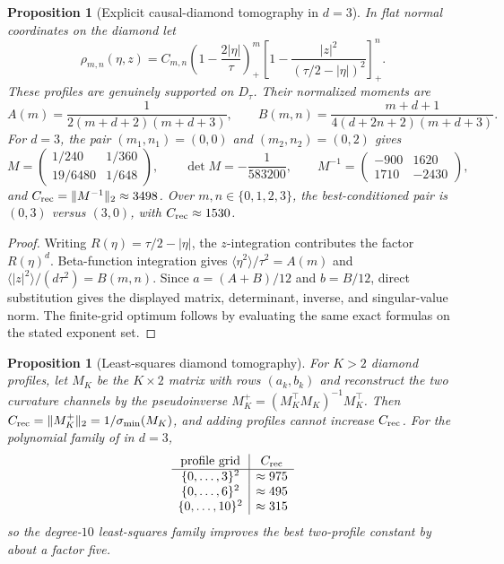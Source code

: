 \documentclass[11pt]{article}
\newtheorem{proposition}[theorem]{Proposition}
\theoremstyle{definition}
\theoremstyle{remark}
\begin{document}
\begin{proposition}[Explicit causal-diamond tomography in $d=3$]
\label{prop:explicit-tomography}
In flat normal coordinates on the diamond let
\[
 \rho_{m,n}(\eta,z)=C_{m,n}
 \left(1-\frac{2|\eta|}{\tau}\right)_+^m
 \left[1-\frac{|z|^2}{(\tau/2-|\eta|)^2}\right]_+^n .
\]
These profiles are genuinely supported on $D_\tau$.  Their normalized moments
are
\[
 A(m)=\frac{1}{2(m+d+2)(m+d+3)},\qquad
 B(m,n)=\frac{m+d+1}{4(d+2n+2)(m+d+3)}.
\]
For $d=3$, the pair $(m_1,n_1)=(0,0)$ and $(m_2,n_2)=(0,2)$ gives
\[
 M=\begin{pmatrix}1/240&1/360\\[2pt]19/6480&1/648\end{pmatrix},
 \qquad \det M=-\frac1{583200},
 \qquad M^{-1}=\begin{pmatrix}-900&1620\\1710&-2430\end{pmatrix},
\]
and $C_{\rm rec}=\|M^{-1}\|_2\approx3498$.  Over
$m,n\in\{0,1,2,3\}$, the best-conditioned pair is $(0,3)$ versus $(3,0)$,
with $C_{\rm rec}\approx1530$.
\end{proposition}

\begin{proof}
Writing $R(\eta)=\tau/2-|\eta|$, the $z$-integration contributes the factor
$R(\eta)^d$.  Beta-function integration gives
$\langle\eta^2\rangle/\tau^2=A(m)$ and
$\langle|z|^2\rangle/(d\tau^2)=B(m,n)$.  Since
$a=(A+B)/12$ and $b=B/12$, direct substitution gives the displayed matrix,
determinant, inverse, and singular-value norm.  The finite-grid optimum follows
by evaluating the same exact formulas on the stated exponent set.
\end{proof}


\begin{proposition}[Least-squares diamond tomography]
\label{prop:least-squares-tomography}
For $K>2$ diamond profiles, let $M_K$ be the $K\times2$ matrix with rows
$(a_k,b_k)$ and reconstruct the two curvature channels by the pseudoinverse
$M_K^+=(M_K^\top M_K)^{-1}M_K^\top$.  Then
$C_{\rm rec}=\|M_K^+\|_2=1/\sigma_{\min}(M_K)$, and adding profiles cannot
increase $C_{\rm rec}$.  For the polynomial family of
 in $d=3$,
\[
\begin{array}{c|c}
\text{profile grid} & C_{\rm rec}\\ \hline
\{0,\ldots,3\}^2 & \approx975\\
\{0,\ldots,6\}^2 & \approx495\\
\{0,\ldots,10\}^2 & \approx315
\end{array}
\]
so the degree-$10$ least-squares family improves the best two-profile constant
by about a factor five.
\end{proposition}
\end{document}
